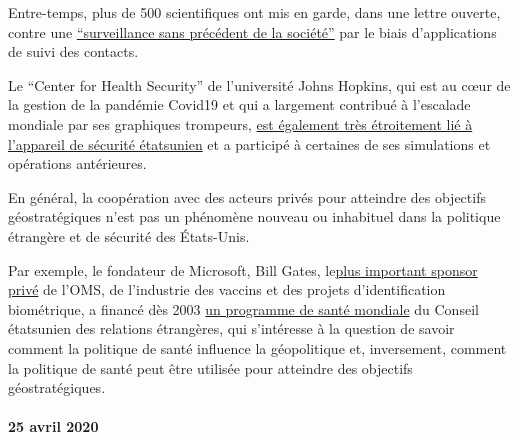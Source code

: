Entre-temps, plus de 500 scientifiques ont mis en garde, dans une lettre
ouverte, contre une
\href{https://www.esat.kuleuven.be/cosic/sites/contact-tracing-joint-statement/}{``surveillance
sans précédent de la société''} par le biais d'applications de suivi des
contacts.

Le ``Center for Health Security'' de l'université Johns Hopkins, qui est
au cœur de la gestion de la pandémie Covid19 et qui a largement
contribué à l'escalade mondiale par ses graphiques trompeurs,
\href{http://unlimitedhangout.com/2020/04/investigative-series/all-roads-lead-to-dark-winter/}{est
également très étroitement lié à l'appareil de sécurité étatsunien} et a
participé à certaines de ses simulations et opérations antérieures.

En général, la coopération avec des acteurs privés pour atteindre des
objectifs géostratégiques n'est pas un phénomène nouveau ou inhabituel
dans la politique étrangère et de sécurité des États-Unis.

Par exemple, le fondateur de Microsoft, Bill Gates,
le\href{https://www.youtube.com/watch?v=wQSYdAX_9JY}{plus important
sponsor privé} de l'OMS, de l'industrie des vaccins et des projets
d'identification biométrique, a financé dès 2003
\href{https://www.cfr.org/news-releases/council-establishes-senior-fellowship-global-health-and-foreign-policy-grant-bill}{un
programme de santé mondiale} du Conseil étatsunien des relations
étrangères, qui s'intéresse à la question de savoir comment la politique
de santé influence la géopolitique et, inversement, comment la politique
de santé peut être utilisée pour atteindre des objectifs
géostratégiques.

\hypertarget{25-avril-2020}{%
\paragraph{25 avril 2020}\label{25-avril-2020}}


